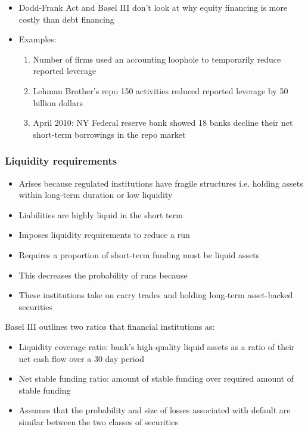 \documentclass[11pt]{beamer}
\begin{document}
\begin{frame}
\begin{itemize}\itemsep10pt
\item Dodd-Frank Act and Basel III don't look at why equity financing is more costly than debt financing
\item Examples:
\begin{enumerate}\itemsep5pt
\item Number of firms used an accounting loophole to temporarily reduce reported leverage
\item Lehman Brother's repo 150 activities reduced reported leverage by 50 billion dollars
\item April 2010: NY Federal reserve bank showed 18 banks decline their net short-term borrowings in the repo market
\end{enumerate}
\end{itemize}
\end{frame}

\begin{frame}
\frametitle{Liquidity requirements}
\begin{itemize}\itemsep10pt
\item Arises because regulated institutions have fragile structures i.e. holding assets within long-term duration or low liquidity
\item Liabilities are highly liquid in the short term
\item Imposes liquidity requirements to reduce a run
\item Requires a proportion of short-term funding must be liquid assets
\item This decreases the probability of runs because
\item These institutions take on carry trades and holding long-term asset-backed securities
\end{itemize}
\end{frame}

\begin{frame}
Basel III outlines two ratios that financial institutions as:
\begin{itemize}\itemsep10pt
\item Liquidity coverage ratio: bank's high-quality liquid assets as a ratio of their net cash flow over a 30 day period
\item Net stable funding ratio: amount of stable funding over required amount of stable funding
\item Assumes that the probability and size of losses associated with default are similar between the two classes of securities
\end{itemize}
\end{frame}
\end{document}
